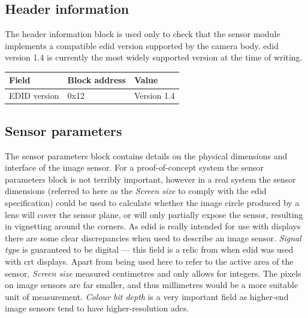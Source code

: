 \subsection{Header information}
The header information block is used only to check that the sensor module implements a compatible \gls{edid} version supported by the camera body. \gls{edid} version 1.4 is currently the most widely supported version at the time of writing.

\begin{table}[h]
    \begin{tabular}{lll}
        Field               & Block address             & Value             \\
        \hline
        EDID version        & 0x12                      & Version 1.4       \\
    \end{tabular}
\end{table}

\subsection{Sensor parameters}
The sensor parameters block contains details on the physical dimensions and interface of the image sensor. For a proof-of-concept system the sensor parameters block is not terribly important, however in a real system the sensor dimensions (referred to here as the \textit{Screen size} to comply with the \gls{edid} specification) could be used to calculate whether the image circle produced by a lens will cover the sensor plane, or will only partially expose the sensor, resulting in vignetting around the corners. As \gls{edid} is really intended for use with displays there are some clear discrepancies when used to describe an image sensor. \textit{Signal type} is guaranteed to be digital --- this field is a relic from when \gls{edid} was used with \gls{crt} displays. Apart from being used here to refer to the active area of the sensor, \textit{Screen size} measured centimetres and only allows for integers. The pixels on image sensors are far smaller, and thus millimetres would be a more suitable unit of measurement. \textit{Colour bit depth} is a very important field as higher-end image sensors tend to have higher-resolution \glspl{adc}.

